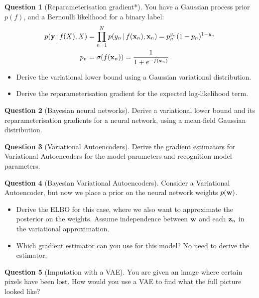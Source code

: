 \documentclass[a4paper]{article}
\theoremstyle{definition}
\newtheorem{question}{Question}
\begin{document}
\begin{question}[Reparameterisation gradient*]
\label{q:gradients}
You have a Gaussian process prior $p(f)$, and a Bernoulli likelihood for a binary label:
\begin{align}
p(\mathbf{y}\,|\, f(X), X) &= \prod_{n=1}^N p(y_n\,|\, f(\mathbf{x}_n), \mathbf{x}_n) = p_n^{y_n}(1-p_n)^{1 - y_n} \\
p_n &= \sigma(f(\mathbf{x}_n)) = \frac{1}{1 + e^{-f(\mathbf{x}_n)}} \,.
\end{align}
\begin{itemize}
  \item Derive the variational lower bound using a Gaussian variational distribution.
  \item Derive the reparameterisation gradient for the expected log-likelihood term.
\end{itemize}
\end{question}


\begin{question}[Bayesian neural networks]
\label{q:bnn}
Derive a variational lower bound and its reparameterisation gradients for a neural network, using a mean-field Gaussian distribution.
\end{question}


\begin{question}[Variational Autoencoders]
\label{q:vae}
Derive the gradient estimators for Variational Autoencoders for the model parameters and recognition model parameters.
\end{question}


\begin{question}[Bayesian Variational Autoencoders]
\label{q:bvae}
Consider a Variational Autoencoder, but now we place a prior on the neural network weights $p(\mathbf{w})$.
\begin{itemize}
\item Derive the ELBO for this case, where we also want to approximate the posterior on the weights. Assume independence between $\mathbf{w}$ and each $\mathbf{z}_n$ in the variational approximation.
\item Which gradient estimator can you use for this model? No need to derive the estimator.
\end{itemize}
\end{question}


\begin{question}[Imputation with a VAE]
You are given an image where certain pixels have been lost. How would you use a VAE to find what the full picture looked like?
\end{question}
\end{document}
